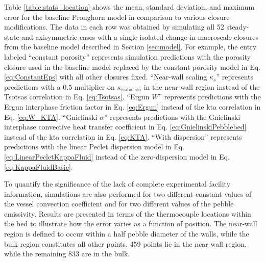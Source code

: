 Table \ref{table:stats_location} shows the mean, standard deviation, and maximum error for the baseline Pronghorn model in comparison to various closure modifications. The data in each row was obtained by simulating all 52 steady-state and axisymmetric cases with a single isolated change in macroscale closures from the baseline model described in Section \ref{sec:model}. For example, the entry labeled ``constant porosity'' represents simulation predictions with the porosity closure used in the baseline model replaced by the constant porosity model in Eq. \eqref{eq:ConstantEps} with all other closures fixed. ``Near-wall scaling \(\kappa_s\)'' represents predictions with a \(0.5\) multiplier on \(\kappa_\text{radiation}\) in the near-wall region instead of the Tsotsas correlation in Eq. \eqref{eq:Tsotsas}. ``Ergun \(W\)'' represents predictions with the Ergun interphase friction factor in Eq. \eqref{eq:Ergun} instead of the \gls{kta} correlation in Eq. \eqref{eq:W_KTA}. ``Gnielinski \(\alpha\)'' represents predictions with the Gnielinski interphase convective heat transfer coefficient in Eq. \eqref{eq:GnielinskiPebblebed} instead of the \gls{kta} correlation in Eq. \eqref{eq:KTA}. ``With dispersion'' represents predictions with the linear Peclet dispersion model in Eq. \eqref{eq:LinearPecletKappaFluid} instead of the zero-dispersion model in Eq. \eqref{eq:KappaFluidBasic}.

To quantify the significance of the lack of complete experimental facility information, simulations are also performed for two different constant values of the vessel convection coefficient and for two different values of the pebble emissivity. Results are presented in terms of the thermocouple locations within the bed to illustrate how the error varies as a function of position. The near-wall region is defined to occur within a half pebble diameter of the walls, while the bulk region constitutes all other points. 459 points lie in the near-wall region, while the remaining 833 are in the bulk.

